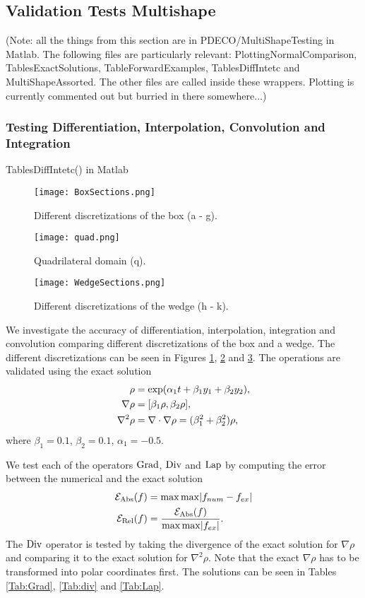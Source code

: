 
\subsection{Validation Tests Multishape}
(Note: all the things from this section are in PDECO/MultiShapeTesting in Matlab. The following files are particularly relevant:
PlottingNormalComparison, TablesExactSolutions, TableForwardExamples, TablesDiffIntetc and MultiShapeAssorted. The other files are called inside these wrappers. Plotting is currently commented out but burried in there somewhere...)

\subsubsection{Testing Differentiation, Interpolation, Convolution and Integration} \label{sec:ValidationDiffIntetc}
TablesDiffIntetc() in Matlab
	\begin{figure}[h]
	\centering
	\texttt{[image: BoxSections.png]}
	\caption{Different discretizations of the box (a - g).} 
	\label{F2}
\end{figure}
\begin{figure}[h]
	\centering
	\texttt{[image: quad.png]}
	\caption{Quadrilateral domain (q).} 
	\label{F3a}
\end{figure}
\begin{figure}[h]
	\centering
	\texttt{[image: WedgeSections.png]}
	\caption{Different discretizations of the wedge (h - k).} 
	\label{F4}
\end{figure}


We investigate the accuracy of differentiation, interpolation, integration and convolution comparing different discretizations of the box and a wedge. The different discretizations can be seen in Figures \ref{F2}, \ref{F3a} and \ref{F4}.
The operations are validated using the exact solution
\begin{align}\label{eq:exactsol1}
	\rho &= \exp( \alpha_1  t + \beta_1 y_1 + \beta_2 y_2),\\
	\nabla \rho &= [\beta_1 \rho, \beta_2 \rho],\notag \\
	\nabla^2 \rho &= \nabla \cdot \nabla \rho = (\beta_1^2 + \beta_2^2)\rho,\notag
\end{align}
where $	\beta_1 = 0.1 $, $\beta_2 = 0.1$, $\alpha_1 = -0.5$.


We test each of the operators $\operatorname{Grad}$, $\operatorname{Div}$ and $\operatorname{Lap}$ by computing the error between the numerical and the exact solution
\begin{align}\label{eq:ErrorMeasure1}
	\mathcal E_{\text{Abs}} (f)&= \max \max \abs{f_{num} - f_{ex}}\\
	\mathcal E_{\text{Rel}} (f)&= \frac{\mathcal E_{\text{Abs}}(f) }{ \max \max \abs{f_{ex}}}.
\end{align}
The $\operatorname{Div}$ operator is tested by taking the divergence of the exact solution for $\nabla \rho$ and comparing it to the exact solution for $\nabla^2 \rho$. Note that the exact $\nabla \rho$ has to be transformed into polar coordinates first. The solutions can be seen in Tables \ref{Tab:Grad}, \ref{Tab:div} and \ref{Tab:Lap}.

